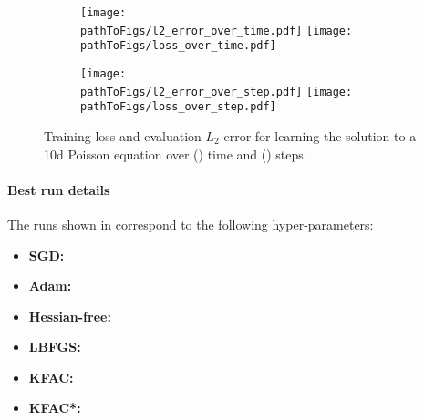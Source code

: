 \begin{figure}[!h]
  \centering
  \def\pathToFigs{../kfac_pinns_exp/exp21_poisson_10d}
  \begin{subfigure}[t]{1.0\linewidth}
    \caption{}\label{subfig:poisson_10d-time}
    \texttt{[image: \\pathToFigs/l2\_error\_over\_time.pdf]}
    \texttt{[image: \\pathToFigs/loss\_over\_time.pdf]}
  \end{subfigure}
  \begin{subfigure}[t]{1.0\linewidth}
    \caption{}\label{subfig:poisson_10d-step}
    \texttt{[image: \\pathToFigs/l2\_error\_over\_step.pdf]}
    \texttt{[image: \\pathToFigs/loss\_over\_step.pdf]}
  \end{subfigure}
  \caption{Training loss and evaluation $L_2$ error for learning the solution to a 10d Poisson equation over () time and () steps.}\label{fig:poisson_10d-appendix}
\end{figure}

\paragraph{Best run details}
The runs shown in  correspond to the following hyper-parameters:
\begin{itemize}
  \def\pathToRuns{../kfac_pinns_exp/exp21_poisson_10d/tex/}
\item \textbf{SGD:} 
\item \textbf{Adam:} 
\item \textbf{Hessian-free:} 
\item \textbf{LBFGS:} 
\item \textbf{KFAC:} 
\item \textbf{KFAC*:} 
\end{itemize}

